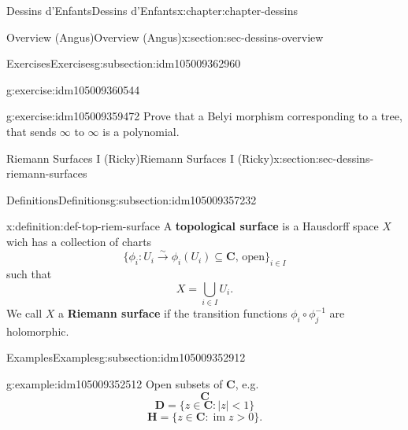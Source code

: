 \documentclass[oneside,10pt,]{book}
\newcommand{\terminology}[1]{\textbf{#1}}
\numberwithin{equation}{section}
\newcommand{\CC}{\mathbf{C}}
\newcommand{\HH}{\mathbf{H}}
\DeclareMathOperator{\im}{im}
\newcommand{\lt}{<}
\newcommand{\gt}{>}
\begin{document}
\begin{chapterptx}{Dessins d'Enfants}{}{Dessins d'Enfants}{}{}{x:chapter:chapter-dessins}
\begin{sectionptx}{Overview (Angus)}{}{Overview (Angus)}{}{}{x:section:sec-dessins-overview}
\begin{subsectionptx}{Exercises}{}{Exercises}{}{}{g:subsection:idm105009362960}
\begin{inlineexercise}{}{g:exercise:idm105009360544}
\end{inlineexercise}
\begin{inlineexercise}{}{g:exercise:idm105009359472}%
Prove that a Belyi morphism corresponding to a tree, that sends \(\infty\) to \(\infty\) is a polynomial.%
\end{inlineexercise}
\end{subsectionptx}
\end{sectionptx}
%
%
\typeout{************************************************}
\typeout{************************************************}
%
\begin{sectionptx}{Riemann Surfaces I (Ricky)}{}{Riemann Surfaces I (Ricky)}{}{}{x:section:sec-dessins-riemann-surfaces}
%
%
\typeout{************************************************}
\typeout{************************************************}
%
\begin{subsectionptx}{Definitions}{}{Definitions}{}{}{g:subsection:idm105009357232}
\begin{definition}{}{x:definition:def-top-riem-surface}%
A \terminology{topological surface} is a Hausdorff space \(X\) wich has a collection of charts%
\begin{equation*}
\{\phi_i \colon U_i \xrightarrow\sim \phi_i(U_i) \subseteq \CC,\,\text{open}\}_{i\in I}
\end{equation*}
such that%
\begin{equation*}
X= \bigcup_{i\in I} U_i\text{.}
\end{equation*}
We call \(X\) a \terminology{Riemann surface} if the transition functions \(\phi_i\circ \phi_j^{-1}\) are holomorphic.%
\end{definition}
\end{subsectionptx}
%
%
\typeout{************************************************}
\typeout{************************************************}
%
\begin{subsectionptx}{Examples}{}{Examples}{}{}{g:subsection:idm105009352912}
\begin{example}{}{g:example:idm105009352512}%
Open subsets of \(\CC\), e.g.%
\begin{equation*}
\CC
\end{equation*}
%
\begin{equation*}
\mathbf D = \{z\in \CC : |z| \lt 1 \}
\end{equation*}
%
\begin{equation*}
\HH = \{z\in \CC : \im z \gt 0 \}\text{.}

\end{equation*}
\end{example}
\end{subsectionptx}
\end{sectionptx}
\end{chapterptx}
\end{document}
